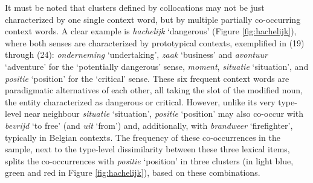 \documentclass[
]{book}
\begin{document}
It must be noted that clusters defined by collocations may not be just characterized by one single context word, but by multiple partially co-occurring context words. A clear example is \emph{hachelijk} `dangerous' (Figure \ref{fig:hachelijk}), where both senses are characterized by prototypical contexts, exemplified in (19) through (24): \emph{onderneming} `undertaking', \emph{zaak} `business' and \emph{avontuur} `adventure' for the `potentially dangerous' sense, \emph{moment}, \emph{situatie} `situation', and \emph{positie} `position' for the `critical' sense.
These six frequent context words are paradigmatic alternatives of each other, all taking the slot of the modified noun, the entity characterized as dangerous or critical. However, unlike its very type-level near neighbour \emph{situatie} `situation', \emph{positie} `position' may also co-occur with \emph{bevrijd} `to free' (and \emph{uit} `from') and, additionally, with \emph{brandweer} `firefighter', typically in Belgian contexts. The frequency of these co-occurrences in the sample, next to the type-level dissimilarity between these three lexical items, splits the co-occurrences with \emph{positie} `position' in three clusters (in light blue, green and red in Figure \ref{fig:hachelijk}), based on these combinations.
\end{document}
